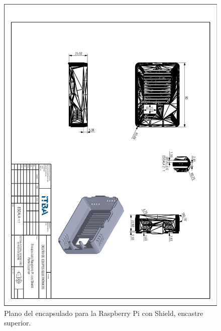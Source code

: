 \begin{figure}[H]
	\centering
	\includegraphics[width=\linewidth]{ImagenesApendice/RpiCasingTop}
	\caption{Plano del encapsulado para la Raspberry Pi con Shield, encastre superior.}
	\label{fig:RpiCasingTop}
\end{figure}